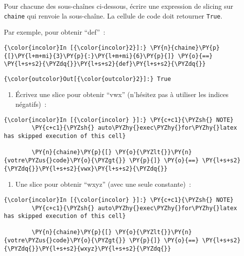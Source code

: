     Pour chacune des sous-chaînes ci-dessous, écrire une expression de
slicing sur \texttt{chaine} qui renvoie la sous-chaîne. La cellule de
code doit retourner \texttt{True}.

    Par exemple, pour obtenir ``def''~:

    \begin{Verbatim}[commandchars=\\\{\},frame=single,framerule=0.3mm,rulecolor=\color{cellframecolor}]
{\color{incolor}In [{\color{incolor}2}]:} \PY{n}{chaine}\PY{p}{[}\PY{l+m+mi}{3}\PY{p}{:}\PY{l+m+mi}{6}\PY{p}{]} \PY{o}{==} \PY{l+s+s2}{\PYZdq{}}\PY{l+s+s2}{def}\PY{l+s+s2}{\PYZdq{}}
\end{Verbatim}


\begin{Verbatim}[commandchars=\\\{\},frame=single,framerule=0.3mm,rulecolor=\color{cellframecolor}]
{\color{outcolor}Out[{\color{outcolor}2}]:} True
\end{Verbatim}
            
    \begin{enumerate}
\def\labelenumi{\arabic{enumi})}
\tightlist
\item
  Écrivez une slice pour obtenir ``vwx'' (n'hésitez pas à utiliser les
  indices négatifs)~:
\end{enumerate}

    \begin{Verbatim}[commandchars=\\\{\},frame=single,framerule=0.3mm,rulecolor=\color{cellframecolor}]
{\color{incolor}In [{\color{incolor} }]:} \PY{c+c1}{\PYZsh{} NOTE}
        \PY{c+c1}{\PYZsh{} auto\PYZhy{}exec\PYZhy{}for\PYZhy{}latex has skipped execution of this cell}
        
        \PY{n}{chaine}\PY{p}{[} \PY{o}{\PYZlt{}}\PY{n}{votre\PYZus{}code}\PY{o}{\PYZgt{}} \PY{p}{]} \PY{o}{==} \PY{l+s+s2}{\PYZdq{}}\PY{l+s+s2}{vwx}\PY{l+s+s2}{\PYZdq{}}
\end{Verbatim}


    \begin{enumerate}
\def\labelenumi{\arabic{enumi})}
\setcounter{enumi}{1}
\tightlist
\item
  Une slice pour obtenir ``wxyz'' (avec une seule constante)~:
\end{enumerate}

    \begin{Verbatim}[commandchars=\\\{\},frame=single,framerule=0.3mm,rulecolor=\color{cellframecolor}]
{\color{incolor}In [{\color{incolor} }]:} \PY{c+c1}{\PYZsh{} NOTE}
        \PY{c+c1}{\PYZsh{} auto\PYZhy{}exec\PYZhy{}for\PYZhy{}latex has skipped execution of this cell}
        
        \PY{n}{chaine}\PY{p}{[} \PY{o}{\PYZlt{}}\PY{n}{votre\PYZus{}code}\PY{o}{\PYZgt{}} \PY{p}{]} \PY{o}{==} \PY{l+s+s2}{\PYZdq{}}\PY{l+s+s2}{wxyz}\PY{l+s+s2}{\PYZdq{}}
\end{Verbatim}


